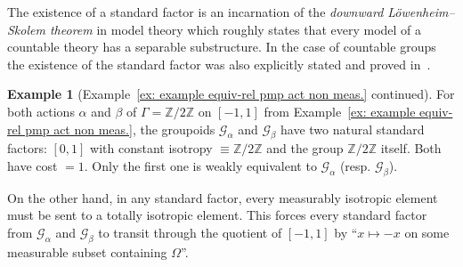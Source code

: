 \documentclass[10pt]{amsart}
\theoremstyle{definition}
\newtheorem{exam}[cdrthm]{Example}
\newcommand{\Zmath}{\mathbb{Z}}
\newcommand{\cg}{\mathcal{G}}
\begin{document}
The existence of a standard factor is an incarnation of the \emph{downward L\"owenheim--Skolem theorem} in model theory which roughly states that every model of a countable theory has a separable substructure. In the case of countable groups the existence of the standard factor was also explicitly stated and proved in~\cite{Card-ultra-prod-we-sofic-arxiv}.

\begin{exam}[Example~\ref{ex: example equiv-rel pmp act non meas.} continued]
For both actions $\alpha$ and $\beta$ of $\Gamma=\Zmath/2\Zmath$ on $[-1,1]$ from Example~\ref{ex: example equiv-rel pmp act non meas.}, the groupoids $\cg_{\alpha}$ and $\cg_{\beta}$ have two natural standard factors: $[0,1]$ with constant isotropy $\equiv \Zmath/2\Zmath$ and the group $ \Zmath/2\Zmath$ itself. Both have cost $=1$. Only the first one is weakly equivalent to $\cg_{\alpha}$ (resp. $\cg_{\beta}$).

On the other hand, in any standard factor, every measurably isotropic element must be sent to a totally isotropic element. This forces every standard factor from $\cg_{\alpha}$ and $\cg_{\beta}$ to transit through the quotient of $[-1,1]$ by ``$x\mapsto -x$ on some measurable subset containing $\Omega$''.
\end{exam}
\end{document}
